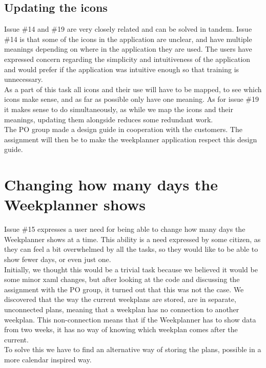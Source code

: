 \subsection{Updating the icons}
Issue \#14 and \#19 are very closely related and can be solved in tandem. Issue \#14 is that some of the icons in the application are unclear, and have multiple meanings depending on where in the application they are used. The users have expressed concern regarding the simplicity and intuitiveness of the application and would prefer if the application was intuitive enough so that training is unnecessary.\\
As a part of this task all icons and their use will have to be mapped, to see which icons make sense, and as far as possible only have one meaning. As for issue \#19 it makes sense to do simultaneously, as while we map the icons and their meanings, updating them alongside reduces some redundant work.\\

The \gls{PO} group made a design guide in cooperation with the customers. The assignment will then be to make the weekplanner application respect this design guide.

\section{Changing how many days the Weekplanner shows}\label{sec:weekPlannerDaysToShow}

Issue \#15 expresses a user need for being able to change how many days the Weekplanner shows at a time. This ability is a need expressed by some citizen, as they can feel a bit overwhelmed by all the tasks, so they would like to be able to show fewer days, or even just one.\\
Initially, we thought this would be a trivial task because we believed it would be some minor \gls{xaml} changes, but after looking at the code and discussing the assignment with the \gls{PO} group, it turned out that this was not the case. We discovered that the way the current weekplans are stored, are in separate, unconnected plans, meaning that a weekplan has no connection to another weekplan. This non-connection means that if the Weekplanner has to show data from two weeks, it has no way of knowing which weekplan comes after the current.\\
To solve this we have to find an alternative way of storing the plans, possible in a more calendar inspired way.\\

